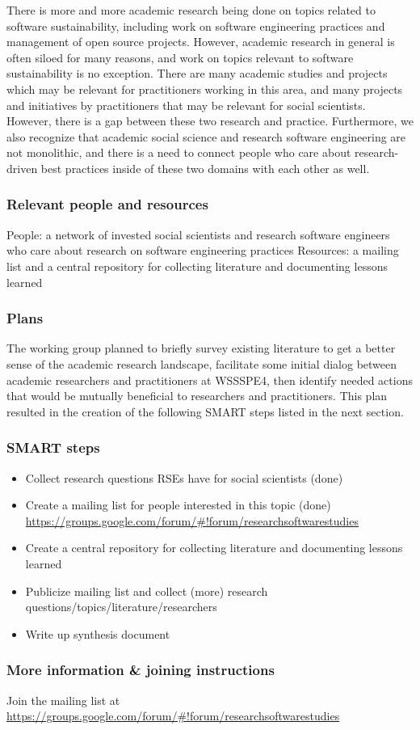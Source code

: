 There is more and more academic research being done on topics related to software sustainability, including work on software engineering practices and management of open source projects. However, academic research in general is often siloed for many reasons, and work on topics relevant to software sustainability is no exception. There are many academic studies and projects which may be relevant for practitioners working in this area, and many projects and initiatives by practitioners that may be relevant for social scientists. However, there is a gap between these two research and practice. Furthermore, we also recognize that academic social science and research software engineering are not monolithic, and there is a need to connect people who care about research-driven best practices inside of these two domains with each other as well.


\subsubsection{Relevant people and resources}

People: a network of invested social scientists and research software engineers who care about research on software engineering practices
Resources: a mailing list and a central repository for collecting literature and documenting lessons learned

\subsubsection{Plans}

The working group planned to briefly survey existing literature to get a better sense of the academic research landscape, facilitate some initial dialog between academic researchers and practitioners at WSSSPE4, then identify needed actions that would be mutually beneficial to researchers and practitioners. This plan resulted in the creation of the following SMART steps listed in the next section.

\subsubsection{SMART steps}

\begin{itemize}
\item Collect research questions RSEs have for social scientists (done)
\item Create a mailing list for people interested in this topic (done) \url{https://groups.google.com/forum/#!forum/researchsoftwarestudies}
\item Create a central repository for collecting literature and documenting lessons learned
\item Publicize mailing list and collect (more) research questions/topics/literature/researchers
\item Write up synthesis document 
\end{itemize}

\subsubsection{More information \& joining instructions}

Join the mailing list at \url{https://groups.google.com/forum/#!forum/researchsoftwarestudies}
